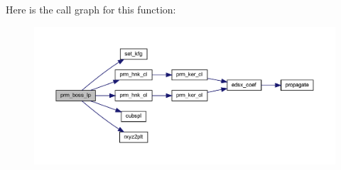 Here is the call graph for this function\+:\nopagebreak
\begin{figure}[H]
\begin{center}
\leavevmode
\includegraphics[width=350pt]{Leroi__c_8f90_ae4548433d1a40c9ae5dce4d7404c9404_cgraph}
\end{center}
\end{figure}
\mbox{\label{Leroi__c_8f90_ac15aa4c46264754ea7abffbe2ea1926c}} 
